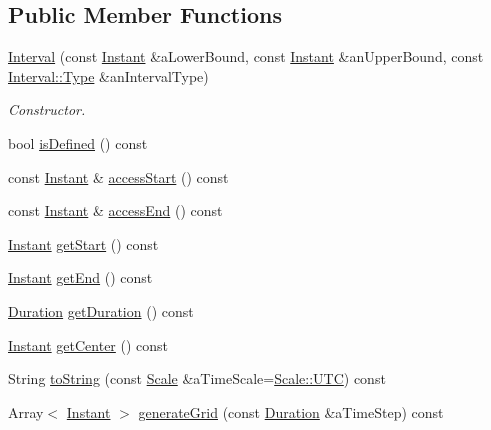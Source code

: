 \subsection*{Public Member Functions}
\begin{DoxyCompactItemize}
\item 
\hyperlink{classlibrary_1_1physics_1_1time_1_1_interval_a49747b0d5f97a92d17f933a23b636156}{Interval} (const \hyperlink{classlibrary_1_1physics_1_1time_1_1_instant}{Instant} \&a\+Lower\+Bound, const \hyperlink{classlibrary_1_1physics_1_1time_1_1_instant}{Instant} \&an\+Upper\+Bound, const \hyperlink{classlibrary_1_1physics_1_1time_1_1_interval_aba490e7120a05be7b17a4d8076f25d48}{Interval\+::\+Type} \&an\+Interval\+Type)
\begin{DoxyCompactList}\small\item\em Constructor. \end{DoxyCompactList}\item 
bool \hyperlink{classlibrary_1_1physics_1_1time_1_1_interval_abbcbeb73fa6528c3e97d6e0c8b4592d8}{is\+Defined} () const
\item 
const \hyperlink{classlibrary_1_1physics_1_1time_1_1_instant}{Instant} \& \hyperlink{classlibrary_1_1physics_1_1time_1_1_interval_a954f0bc3e13e64956e697b4f87521c07}{access\+Start} () const
\item 
const \hyperlink{classlibrary_1_1physics_1_1time_1_1_instant}{Instant} \& \hyperlink{classlibrary_1_1physics_1_1time_1_1_interval_acdf92b0713da0d9691f5c25acb4c8001}{access\+End} () const
\item 
\hyperlink{classlibrary_1_1physics_1_1time_1_1_instant}{Instant} \hyperlink{classlibrary_1_1physics_1_1time_1_1_interval_a17fe30453121eac9666827f9e64e0a52}{get\+Start} () const
\item 
\hyperlink{classlibrary_1_1physics_1_1time_1_1_instant}{Instant} \hyperlink{classlibrary_1_1physics_1_1time_1_1_interval_ae61db32de1d59012b0fcea67d9c4f102}{get\+End} () const
\item 
\hyperlink{classlibrary_1_1physics_1_1time_1_1_duration}{Duration} \hyperlink{classlibrary_1_1physics_1_1time_1_1_interval_aab7bd7557fe401d9dd39716679a922af}{get\+Duration} () const
\item 
\hyperlink{classlibrary_1_1physics_1_1time_1_1_instant}{Instant} \hyperlink{classlibrary_1_1physics_1_1time_1_1_interval_aadbe0ae610cc0cd188d94c41b7a03ade}{get\+Center} () const
\item 
String \hyperlink{classlibrary_1_1physics_1_1time_1_1_interval_a1a76aed1663bc669e8115425e86f993e}{to\+String} (const \hyperlink{namespacelibrary_1_1physics_1_1time_a09d2bc9fbc7b0b5f92e1419bd655e6bb}{Scale} \&a\+Time\+Scale=\hyperlink{namespacelibrary_1_1physics_1_1time_a09d2bc9fbc7b0b5f92e1419bd655e6bba9234324ddf6b4176b57d803a925b7961}{Scale\+::\+U\+TC}) const
\item 
Array$<$ \hyperlink{classlibrary_1_1physics_1_1time_1_1_instant}{Instant} $>$ \hyperlink{classlibrary_1_1physics_1_1time_1_1_interval_aac7b4202a0d0079f59be089b6049beb3}{generate\+Grid} (const \hyperlink{classlibrary_1_1physics_1_1time_1_1_duration}{Duration} \&a\+Time\+Step) const
\end{DoxyCompactItemize}
